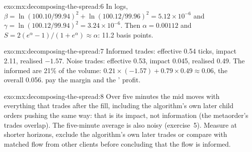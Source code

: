 \begin{solution}{exo:mx:decomposing-the-spread:6}
In logs, $\beta=\ln(100.10/99.94)^2+\ln(100.12/99.96)^2=5.12\times10^{-6}$ and $\gamma=\ln(100.12/99.94)^2=3.24\times10^{-6}$. Then $\alpha=0.00112$ and
$S=2(e^\alpha-1)/(1+e^\alpha)\approx\alpha$: 11.2 basis points.
\end{solution}

\begin{solution}{exo:mx:decomposing-the-spread:7}
Informed trades: effective 0.54 ticks, impact 2.11, realised $-1.57$. Noise trades: effective 0.53, impact 0.045, realised 0.49. The informed are 21\% of
the volume: $0.21\times(-1.57)+0.79\times0.49\approx0.06$, the overall 0.056.  pay the margin and the ' profit.
\end{solution}

\begin{solution}{exo:mx:decomposing-the-spread:8}
Over five minutes the mid moves with everything that trades after the fill, including the algorithm's own later child orders pushing the same way: that
is its impact, not information (the metaorder's trades overlap). The five-minute average is also noisy (exercise~5). Measure at shorter horizons,
exclude the algorithm's own later trades or compare with matched flow from other clients before concluding that the flow is informed.
\end{solution}

